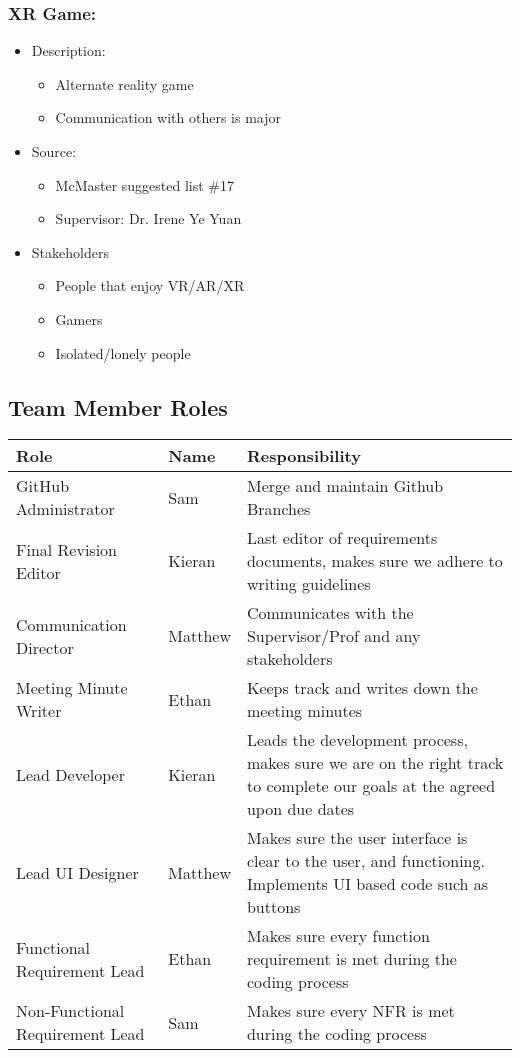 \documentclass{article}
\begin{document}
\subsubsection*{XR Game:}
\label{subsec:xrgame}
\begin{itemize}
    \item Description:
    \begin{itemize}
        \item Alternate reality game
        \item Communication with others is major
    \end{itemize}
    \item Source:
    \begin{itemize}
        \item McMaster suggested list \#17
        \item Supervisor: Dr. Irene Ye Yuan
    \end{itemize}
    \item Stakeholders
    \begin{itemize}
        \item People that enjoy VR/AR/XR
        \item Gamers
        \item Isolated/lonely people
    \end{itemize}
\end{itemize}

\subsection*{Team Member Roles}
\label{sec:roles}

\begin{tabularx}{0.8\textwidth} { 
  | >{\raggedright\arraybackslash}X 
  | >{\centering\arraybackslash}X 
  | >{\raggedleft\arraybackslash}X | }
\hline
  Role & Name & Responsibility\\
\hline
 GitHub Administrator & Sam & Merge and maintain Github Branches \\
\hline
 Final Revision Editor  & Kieran & Last editor of requirements documents, makes sure we adhere to writing guidelines  \\
\hline
Communication Director  & Matthew & Communicates with the Supervisor/Prof and any stakeholders \\
\hline
Meeting Minute Writer & Ethan & Keeps track and writes down the meeting minutes \\
\hline
Lead Developer & Kieran & Leads the development process, makes sure we are on the right track to complete our goals at the agreed upon due dates \\
\hline
Lead UI Designer & Matthew & Makes sure the user interface is clear to the user, and functioning. Implements UI based code such as buttons\\
\hline
Functional Requirement Lead & Ethan & Makes sure every function requirement is met during the coding process\\
\hline
Non-Functional Requirement Lead & Sam & Makes sure every NFR is met during the coding process\\
\hline
\end{tabularx}
\end{document}

